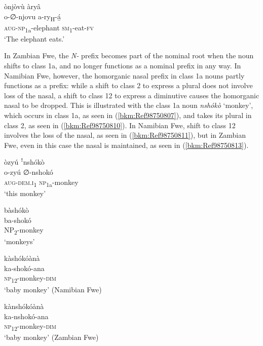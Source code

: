 \ea
\label{bkm:Ref74912549}
ònjòvù àryâ\\
\gll o-∅-njovu    a-ry\textsubscript{H}-á̲\\
\textsc{aug}-\textsc{np}\textsubscript{1a}-elephant  \textsc{sm}\textsubscript{1}-eat-\textsc{fv}\\
\glt ‘The elephant eats.’
\z

In Zambian Fwe, the \textit{N-} prefix becomes part of the nominal root when the noun shifts to class 1a, and no longer functions as a nominal prefix in any way. In Namibian Fwe, however, the homorganic nasal prefix in class 1a nouns partly functions as a prefix: while a shift to class 2 to express a plural does not involve loss of the nasal, a shift to class 12 to express a diminutive causes the homorganic nasal to be dropped. This is illustrated with the class 1a noun \textit{nshókò} ‘monkey’, which occurs in class 1a, as seen in (\ref{bkm:Ref98750807}), and takes its plural in class 2, as seen in (\ref{bkm:Ref98750810}). In Namibian Fwe, shift to class 12 involves the loss of the nasal, as seen in (\ref{bkm:Ref98750811}), but in Zambian Fwe, even in this case the nasal is maintained, as seen in (\ref{bkm:Ref98750813}).

\ea
\label{bkm:Ref98750807}
òzyú ꜝnshókò\\
\gll o-zyú    ∅-nshokó\\
\textsc{aug}-\textsc{dem}.\textsc{i}\textsubscript{1}  \textsc{np}\textsubscript{1a}-monkey\\
\glt ‘this monkey’
\z

\ea
\label{bkm:Ref98750810}
bàshókò \\
\gll ba-shokó\\
NP\textsubscript{2}-monkey\\
\glt ‘monkeys’
\z

\ea
\label{bkm:Ref98750811}
kàshókóànà\\
\gll ka-shokó-ana\\
\textsc{np}\textsubscript{12}-monkey-\textsc{dim}\\
\glt ‘baby monkey’ (Namibian Fwe)
\z

\ea
\label{bkm:Ref98750813}
kànshókóànà\\
\gll ka-nshokó-ana\\
\textsc{np}\textsubscript{12}-monkey-\textsc{dim}\\
\glt ‘baby monkey’ (Zambian Fwe)
\z

